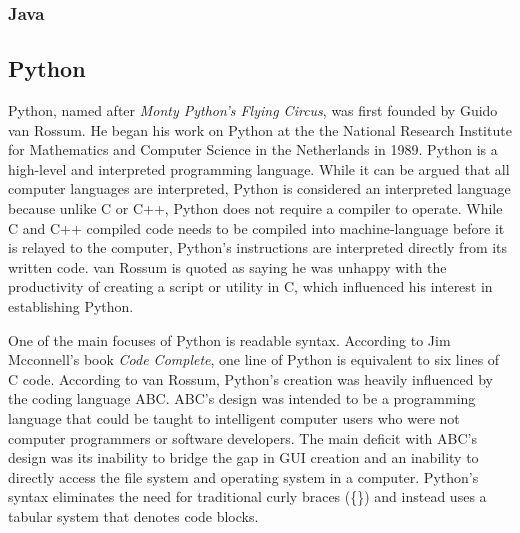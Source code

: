 \subsubsection{Java}

\subsection{Python}
\label{sub:Python}
Python, named after \textit{Monty Python's Flying Circus}, was first founded by Guido van Rossum.  He began his work on Python at the the National Research Institute for Mathematics and Computer Science in the Netherlands in 1989.  Python is a high-level and interpreted programming language.  While it can be argued that all computer languages are interpreted, Python is considered an interpreted language because unlike C or C++, Python does not require a compiler to operate.  While C and C++ compiled code needs to be compiled into machine-language before it is relayed to the computer, Python's instructions are interpreted directly from its written code.  van Rossum is quoted as saying he was unhappy with the productivity of creating a script or utility in C, which influenced his interest in establishing Python\cite{vanBlog1}.

One of the main focuses of Python is readable syntax.  According to Jim Mcconnell's book \textit{Code Complete}, one line of Python is equivalent to six lines of C code\cite{mcconnell2004code}.  According to van Rossum, Python's creation was heavily influenced by the coding language ABC.  ABC's design was intended to be a programming language that could be taught to intelligent computer users who were not computer programmers or software developers.  The main deficit with ABC's design was its inability to bridge the gap in GUI creation and an inability to directly access the file system and operating system in a computer.  Python's syntax eliminates the need for traditional curly braces (\{\}) and instead uses a tabular system that denotes code blocks.
